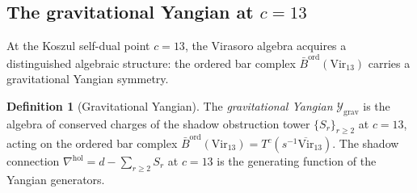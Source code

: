 \documentclass[11pt,reqno]{amsart}
\theoremstyle{definition}
\newtheorem{definition}[theorem]{Definition}
\theoremstyle{remark}
\begin{document}
\subsection{The gravitational Yangian at $c = 13$}
\label{sec:gravitational-yangian}

At the Koszul self-dual point $c = 13$, the Virasoro algebra
acquires a distinguished algebraic structure: the ordered bar
complex $\bar{B}^{\mathrm{ord}}(\mathrm{Vir}_{13})$ carries a
gravitational Yangian symmetry.

\begin{definition}[Gravitational Yangian]
\label{def:gravitational-yangian}
The \emph{gravitational Yangian}
$\mathcal{Y}_{\mathrm{grav}}$ is the algebra of conserved
charges of the shadow obstruction tower
$\{S_r\}_{r \ge 2}$ at $c = 13$, acting on the ordered bar
complex $\bar{B}^{\mathrm{ord}}(\mathrm{Vir}_{13})
= T^c(s^{-1}\overline{\mathrm{Vir}}_{13})$.
The shadow connection $\nabla^{\mathrm{hol}} = d - \sum_{r \ge 2}
S_r$ at $c = 13$ is the generating function of the Yangian
generators.
\end{definition}
\end{document}
